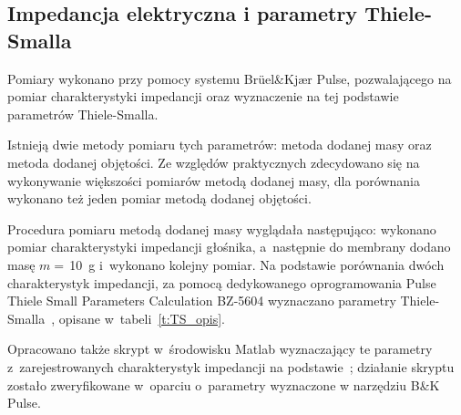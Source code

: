 \documentclass[12pt]{oska}
\begin{document}
	\subsection{Impedancja elektryczna i parametry Thiele-Smalla}
	
	Pomiary wykonano przy pomocy systemu Brüel\&Kjær Pulse, pozwalającego na pomiar charakterystyki impedancji oraz wyznaczenie na tej podstawie parametrów Thiele-Smalla.
	
	Istnieją dwie metody pomiaru tych parametrów: metoda dodanej masy oraz metoda dodanej objętości. Ze względów praktycznych zdecydowano się na wykonywanie większości pomiarów metodą dodanej masy, dla porównania wykonano też jeden pomiar metodą dodanej objętości.
	
	Procedura pomiaru metodą dodanej masy wyglądała następująco: wykonano pomiar charakterystyki impedancji głośnika, a~następnie do membrany dodano masę $m=\,$\SI{10}{\gram} i~wykonano kolejny pomiar. Na podstawie porównania dwóch charakterystyk impedancji, za pomocą dedykowanego oprogramowania Pulse Thiele Small Parameters Calculation BZ-5604 wyznaczano parametry Thiele-Smalla~\cite{BK_pulse_TS}, opisane w~tabeli~\ref{t:TS_opis}.
	
	Opracowano także skrypt w~środowisku Matlab wyznaczający te parametry z~zarejestrowanych charakterystyk impedancji na podstawie~\cite{dobrucki}; działanie skryptu zostało zweryfikowane w~oparciu o~parametry wyznaczone w narzędziu B\&K Pulse.
	
\end{document}
